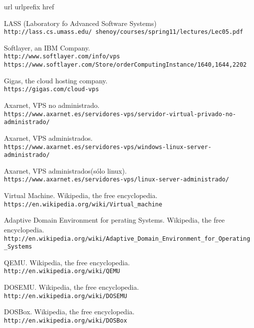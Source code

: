 \begin{thebibliography}{10}
\expandafter\ifx\csname url\endcsname\relax
  \def\url#1{\texttt{#1}}\fi
\expandafter\ifx\csname urlprefix\endcsname\relax\def\urlprefix{URL }\fi
\expandafter\ifx\csname href\endcsname\relax
  \def\href#1#2{#2} \def\path#1{#1}\fi

LASS (Laboratory fo Advanced Software Systems)\\
  \url{http://lass.cs.umass.edu/~shenoy/courses/spring11/lectures/Lec05.pdf}

Softlayer, an IBM Company.\\
  \url{http://www.softlayer.com/info/vps}\\
  \url{https://www.softlayer.com/Store/orderComputingInstance/1640,1644,2202}

Gigas, the cloud hosting company.\\
  \url{https://gigas.com/cloud-vps}

Axarnet, VPS no administrado.\\
  \url{https://www.axarnet.es/servidores-vps/servidor-virtual-privado-no-administrado/}

Axarnet, VPS administrados.\\
  \url{https://www.axarnet.es/servidores-vps/windows-linux-server-administrado/}

Axarnet, VPS administrados(sólo linux).\\
  \url{https://www.axarnet.es/servidores-vps/linux-server-administrado/}

Virtual Machine. Wikipedia, the free encyclopedia.\\
  \url{https://en.wikipedia.org/wiki/Virtual_machine}

Adaptive Domain Environment for perating Systems. Wikipedia, the free encyclopedia.\\
  \url{http://en.wikipedia.org/wiki/Adaptive_Domain_Environment_for_Operating_Systems}

QEMU. Wikipedia, the free encyclopedia.\\
  \url{http://en.wikipedia.org/wiki/QEMU}

DOSEMU. Wikipedia, the free encyclopedia.\\
  \url{http://en.wikipedia.org/wiki/DOSEMU}

DOSBox. Wikipedia, the free encyclopedia.\\
  \url{http://en.wikipedia.org/wiki/DOSBox}


\end{thebibliography}
